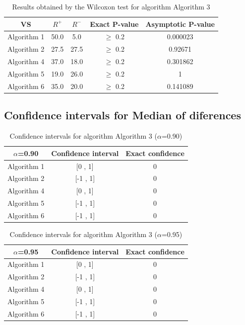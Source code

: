 \documentclass[a4paper,10pt]{article}
\begin{document}
\begin{table}[!htp]
\centering\small
\begin{tabular}{
|c|c|c|c|c|}
\hline
 VS & $R^{+}$ & $R^{-}$ & Exact P-value & Asymptotic P-value \\ \hline 
Algorithm 1 & 50.0 & 5.0 & $\geq$ 0.2 & 0.000023\\ \hline 
Algorithm 2 & 27.5 & 27.5 & $\geq$ 0.2 & 0.92671\\ \hline 
Algorithm 4 & 37.0 & 18.0 & $\geq$ 0.2 & 0.301862\\ \hline 
Algorithm 5 & 19.0 & 26.0 & $\geq$ 0.2 & 1\\ \hline 
Algorithm 6 & 35.0 & 20.0 & $\geq$ 0.2 & 0.141089\\ \hline 

\end{tabular}
\caption{Results obtained by the Wilcoxon test for algorithm Algorithm 3}
\end{table}

\subsection{Confidence intervals for Median of diferences}

\begin{table}[!htp]
\centering\small
\begin{tabular}{
|c|c|c|}
\hline
 $\alpha$=0.90 & Confidence interval & Exact confidence \\ \hline 
Algorithm 1 & [0 , 1] & 0\\ \hline 
Algorithm 2 & [-1 , 1] & 0\\ \hline 
Algorithm 4 & [0 , 1] & 0\\ \hline 
Algorithm 5 & [-1 , 1] & 0\\ \hline 
Algorithm 6 & [-1 , 1] & 0\\ \hline 

\end{tabular}
\caption{Confidence intervals for algorithm Algorithm 3 ($\alpha$=0.90)}
\end{table}
\begin{table}[!htp]
\centering\small
\begin{tabular}{
|c|c|c|}
\hline
 $\alpha$=0.95 & Confidence interval & Exact confidence \\ \hline 
Algorithm 1 & [0 , 1] & 0\\ \hline 
Algorithm 2 & [-1 , 1] & 0\\ \hline 
Algorithm 4 & [0 , 1] & 0\\ \hline 
Algorithm 5 & [-1 , 1] & 0\\ \hline 
Algorithm 6 & [-1 , 1] & 0\\ \hline 

\end{tabular}
\caption{Confidence intervals for algorithm Algorithm 3 ($\alpha$=0.95)}
\end{table}
\end{document}

